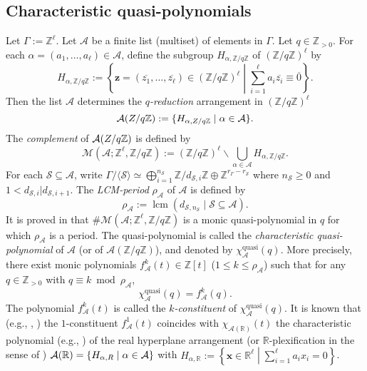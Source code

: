 \documentclass[12pt]{amsart}
\theoremstyle{plain}
\theoremstyle{definition}
\theoremstyle{remark}
\newcommand{\A}{\mathcal{A}}
\newcommand{\R}{\mathbb{R}}
\newcommand{\scS}{\mathcal{S}}
\newcommand{\Z}{\mathbb{Z}}
\newcommand{\M}{\mathcal{M}}
\newcommand{\lcm}{\operatorname{lcm}}
\newcommand{\quasi}{\operatorname{quasi}}
\begin{document}
\subsection{Characteristic quasi-polynomials} 
Let $\Gamma:=\Z^\ell$.
Let $\A$ be a finite list (multiset) of elements in $\Gamma$. 
Let $q\in\Z_{>0}$.
For each $\alpha=(a_1,\ldots,a_\ell) \in \A$, define the subgroup $H_{\alpha, \Z/q\Z}$ of $(\Z/q\Z)^\ell$ by 
$$H_{\alpha, \Z/q\Z}:=\left\{\textbf{z} = (\overline{z_1}, \ldots, \overline{z_\ell})\in  (\Z/q\Z)^\ell  \middle| \sum_{i=1}^\ell a_i \overline{z_i}\equiv\overline{0}\right\}.$$ 
Then the list $\A$ determines the \emph{$q$-reduction} arrangement in $(\Z/q\Z)^\ell$
$$\A(\Bbb \Z/q\Z):=\{H_{\alpha, \Bbb \Z/q\Z} \mid \alpha  \in \A\}.$$
The \emph{complement} of  $\A(\Bbb \Z/q\Z)$ is defined by
$$\M(\A; \Z^\ell,\Z/q\Z):= (\Z/q\Z)^\ell \smallsetminus\bigcup_{\alpha\in\A}H_{\alpha,\Z/q\Z}. $$
For each $\scS\subseteq \A$, write $\Gamma/\langle\scS\rangle\simeq\bigoplus_{i=1}^{n_{\scS}}\Z/d_{\scS, i}\Z\oplus
\Z^{r_{\Gamma}-r_{\scS}}$ where 
$n_{\scS}\geq 0$ and $1<d_{\scS, i}|d_{\scS, i+1}$. 
The \emph{LCM-period} $\rho_{\A}$ of $\A$ is defined by 
\begin{equation*}
\label{eq:LCM-period}
\rho_\A:=\lcm(d_{\scS, n_{\scS}}\mid\scS\subseteq \A). 
\end{equation*} 
It is proved in \cite[Theorem 2.4]{KTT08} that 
$\#\M(\A; \Z^\ell, \Z/q\Z)$ is a monic quasi-polynomial in $q$ for which $\rho_{\A}$ is a period. 
The quasi-polynomial is called the \emph{characteristic quasi-polynomial} of $\A$ (or of $\A(\Z/q\Z)$), and denoted by $\chi^{\quasi}_{\A}(q)$. 
More precisely, there exist monic polynomials 
$f_{\A}^k(t)\in\Z[t]$ ($1 \le k \le \rho_\A$) such that 
for any $q\in\Z_{>0}$ with $q\equiv k\bmod \rho_\A$, 
\begin{equation*}
\chi^{\quasi}_{\A}(q) =f^k_\A(q).
\end{equation*} 
The polynomial $f^k_\A(t)$ is called the \emph{$k$-constituent} of $\chi^{\quasi}_{\A}(q)$. 
It is known that (e.g.,  \cite{A96}, \cite{KTT08}) the $1$-constituent $f^1_\A(t)$ coincides with $\chi_{\A(\R)}(t)$ the characteristic polynomial (e.g., \cite[Definition 2.52]{OT92}) of the real hyperplane arrangement (or $\R$-plexification in the sense of \cite{LTY17}) $\A(\R)=\{H_{\alpha, \Bbb \R} \mid \alpha  \in \A\}$ with 
$H_{\alpha, \R}:=\left\{\textbf{x} \in  \R^\ell  \middle| \sum_{i=1}^\ell a_ix_i=0\right\}$.

\end{document}
